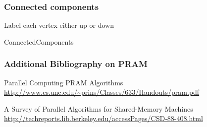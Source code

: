 \documentclass[14pt]{beamer}
\begin{document}
\begin{frame}\frametitle{Connected components}
  \begin{algorithm}[H]
    Label each vertex either \alert{up} or \alert{down}\;
    \caption{ConnectedComponents}
  \end{algorithm}
\end{frame}

\begin{frame}\frametitle{Additional Bibliography on PRAM}
  \small
   Parallel Computing PRAM Algorithms
   \url{http://www.cs.unc.edu/~prins/Classes/633/Handouts/pram.pdf}

A Survey of Parallel Algorithms for Shared-Memory Machines
\url{http://techreports.lib.berkeley.edu/accessPages/CSD-88-408.html}
\end{frame}
\end{document}
